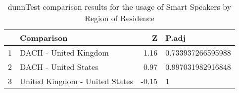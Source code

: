 \begin{table}[ht]
\centering
\begin{tabular}{rlrl}
  \hline
 & Comparison & Z & P.adj \\ 
  \hline
1 & DACH - United Kingdom & 1.16 & 0.733937266595988   \\ 
  2 & DACH - United States & 0.97 & 0.997031982916848   \\ 
  3 & United Kingdom - United States & -0.15 & 1   \\ 
   \hline
\end{tabular}
\caption{dunnTest comparison results for the usage of Smart Speakers by Region of Residence} 
\label{RQ2_H2_UsageRegionSmartSpeaker}
\end{table}
